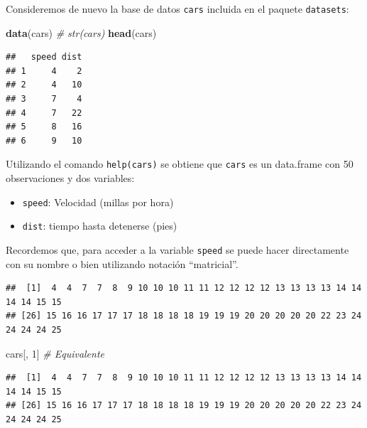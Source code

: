 \documentclass[]{book}
\newenvironment{Shaded}{\begin{snugshade}}{\end{snugshade}}
\newcommand{\KeywordTok}[1]{\textcolor[rgb]{0.13,0.29,0.53}{\textbf{#1}}}
\newcommand{\DecValTok}[1]{\textcolor[rgb]{0.00,0.00,0.81}{#1}}
\newcommand{\CommentTok}[1]{\textcolor[rgb]{0.56,0.35,0.01}{\textit{#1}}}
\newcommand{\OperatorTok}[1]{\textcolor[rgb]{0.81,0.36,0.00}{\textbf{#1}}}
\newcommand{\NormalTok}[1]{#1}
\begin{document}
Consideremos de nuevo la base de datos \texttt{cars} incluida en el
paquete \texttt{datasets}:

\begin{Shaded}
\begin{Highlighting}[]
\KeywordTok{data}\NormalTok{(cars)}
\CommentTok{# str(cars)}
\KeywordTok{head}\NormalTok{(cars)}
\end{Highlighting}
\end{Shaded}

\begin{verbatim}
##   speed dist
## 1     4    2
## 2     4   10
## 3     7    4
## 4     7   22
## 5     8   16
## 6     9   10
\end{verbatim}

Utilizando el comando \texttt{help(cars)} se obtiene que \texttt{cars}
es un data.frame con 50 observaciones y dos variables:

\begin{itemize}
\item
  \texttt{speed}: Velocidad (millas por hora)
\item
  \texttt{dist}: tiempo hasta detenerse (pies)
\end{itemize}

Recordemos que, para acceder a la variable \texttt{speed} se puede hacer
directamente con su nombre o bien utilizando notación ``matricial''.

\begin{Shaded}
\end{Shaded}

\begin{verbatim}
##  [1]  4  4  7  7  8  9 10 10 10 11 11 12 12 12 12 13 13 13 13 14 14 14 14 15 15
## [26] 15 16 16 17 17 17 18 18 18 18 19 19 19 20 20 20 20 20 22 23 24 24 24 24 25
\end{verbatim}

\begin{Shaded}
\begin{Highlighting}[]
\NormalTok{cars[, }\DecValTok{1}\NormalTok{]  }\CommentTok{# Equivalente}
\end{Highlighting}
\end{Shaded}

\begin{verbatim}
##  [1]  4  4  7  7  8  9 10 10 10 11 11 12 12 12 12 13 13 13 13 14 14 14 14 15 15
## [26] 15 16 16 17 17 17 18 18 18 18 19 19 19 20 20 20 20 20 22 23 24 24 24 24 25
\end{verbatim}
\end{document}
